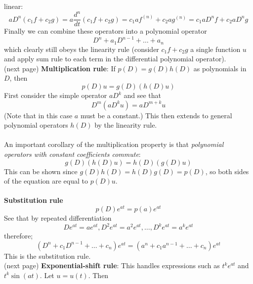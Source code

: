 \documentclass{report}
\begin{document}
linear:
\begin{equation*}
aD^n(c_1f+c_2g)=a\frac{d^n}{dt}(c_1f+c_2g)=c_1af^{(n)}+c_2ag^{(n)}=c_1aD^nf+c_2aD^ng
\end{equation*}
Finally we can combine these operators into a polynomial operator
\begin{equation*}
D^n+a_1D^{n-1}+\ldots+a_n
\end{equation*}
which clearly still obeys the linearity rule (consider $c_1f+c_2g$ a single function $u$ and apply
sum rule to each term in the differential polynomial operator).\\
(next page)
\newpage
\noindent\textbf{Multiplication rule}: If $p(D)=g(D)h(D)$ as polynomials in $D$, then
\begin{equation*}
p(D)u=g(D)(h(D)u)
\end{equation*}
First consider the simple operator $aD^k$ and see that
\begin{equation*}
D^m(aD^ku)=aD^{m+k}u
\end{equation*}
(Note that in this case $a$ must be a constant.) This then extends to general polynomial operators $h(D)$ by 
the linearity rule.\\
\vspace{1mm}\\
An important corollary of the multiplication property is that \textit{polynomial operators with constant
coefficients commute}:
\begin{equation*}
g(D)(h(D)u)=h(D)(g(D)u)
\end{equation*}
This can be shown since $g(D)h(D)=h(D)g(D)=p(D)$, so both sides of the equation are equal to $p(D)u$.\\
\vspace{1mm}\\
\textbf{Substitution rule}
\begin{equation*}
p(D)e^{at}=p(a)e^{at}
\end{equation*}
See that by repeated differentiation
\begin{equation*}
De^{at}=ae^{at},D^2e^{at}=a^2e^{at},\ldots,D^ke^{at}=a^ke^{at}
\end{equation*}
therefore;
\begin{equation*}
(D^n+c_1D^{n-1}+\ldots+c_n)e^{at}=(a^n+c_1a^{n-1}+\ldots+c_n)e^{at}
\end{equation*}
This is the substitution rule.\\
(next page)
\newpage
\noindent\textbf{Exponential-shift rule}: This handles expressions such as $t^ke^{at}$ and $t^k\sin(at)$. 
Let $u=u(t)$. Then
\end{document}
